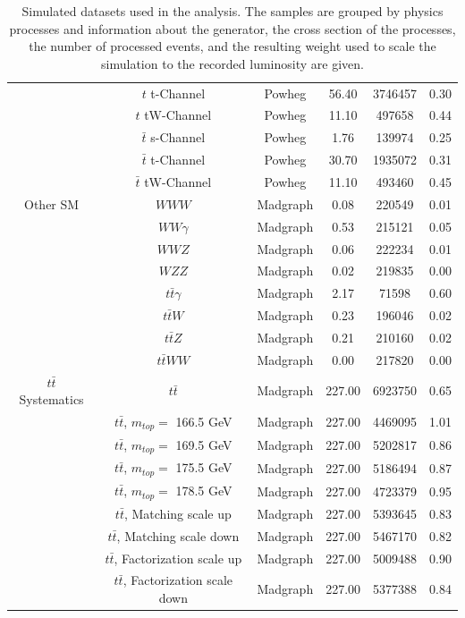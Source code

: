 \begin{table}
\begin{center}
\begin{tabular}{c|c|c|c|c|c}
 & $t$ t-Channel & Powheg & 56.40 & 3746457 & 0.30 \\
 & $t$ tW-Channel & Powheg & 11.10 & 497658 & 0.44 \\
 & $\bar{t}$ s-Channel & Powheg & 1.76 & 139974 & 0.25 \\
 & $\bar{t}$ t-Channel & Powheg & 30.70 & 1935072 & 0.31 \\
 & $\bar{t}$ tW-Channel & Powheg & 11.10 & 493460 & 0.45 \\
\hline 
Other SM & $WWW$ & Madgraph & 0.08 & 220549 & 0.01 \\
 & $WW\gamma$ & Madgraph & 0.53 & 215121 & 0.05 \\
 & $WWZ$ & Madgraph & 0.06 & 222234 & 0.01 \\
 & $WZZ$ & Madgraph & 0.02 & 219835 & 0.00 \\
 & $t\bar{t}\gamma$ & Madgraph & 2.17 & 71598 & 0.60 \\
 & $t\bar{t}W$ & Madgraph & 0.23 & 196046 & 0.02 \\
 & $t\bar{t}Z$ & Madgraph & 0.21 & 210160 & 0.02 \\
 & $t\bar{t}WW$ & Madgraph & 0.00 & 217820 & 0.00 \\
\hline 
$t\bar{t}$ Systematics & $t\bar{t}$ & Madgraph & 227.00 & 6923750 & 0.65 \\
 & $t\bar{t}$, $m_{top} =$ 166.5 GeV & Madgraph & 227.00 & 4469095 & 1.01 \\
 & $t\bar{t}$, $m_{top} =$ 169.5 GeV & Madgraph & 227.00 & 5202817 & 0.86 \\
 & $t\bar{t}$, $m_{top} =$ 175.5 GeV & Madgraph & 227.00 & 5186494 & 0.87 \\
 & $t\bar{t}$, $m_{top} =$ 178.5 GeV & Madgraph & 227.00 & 4723379 & 0.95 \\
 & $t\bar{t}$, Matching scale up & Madgraph & 227.00 & 5393645 & 0.83 \\
 & $t\bar{t}$, Matching scale down & Madgraph & 227.00 & 5467170 & 0.82 \\
 & $t\bar{t}$, Factorization scale up & Madgraph & 227.00 & 5009488 & 0.90 \\
 & $t\bar{t}$, Factorization scale down & Madgraph & 227.00 & 5377388 & 0.84 \\

\end{tabular}
\caption{Simulated datasets used in the analysis. The samples are grouped by physics processes and information about the generator, the cross section of the processes, the number of processed events, and the resulting weight used to scale the simulation to the recorded luminosity are given.}
\label{tab:MCSamples}
\end{center}
\end{table}

